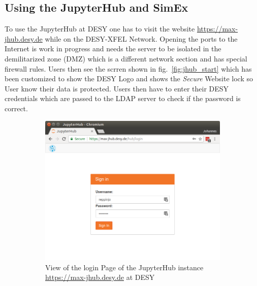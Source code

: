 \documentclass[10pt]{scrartcl}
\begin{document}
\subsection{Using the JupyterHub and SimEx}
To use the JupyterHub at DESY one has to visit the website \url{https://max-jhub.desy.de} while on the DESY-XFEL Network.
Opening the ports to the Internet is work in progress and needs the server to be isolated in the demilitarized zone (DMZ) which is a different network section and has special firewall rules.
Users then see the scrren shown in fig.~\ref{fig:jhub_start} which has been customized to show the DESY Logo and shows the \textit{Secure} Website lock so User know their data is protected.
Users then have to enter their DESY credentials which are passed to the LDAP server to check if the password is correct.
%
\begin{figure}
  \centering
  \begin{subfigure}{0.45\textwidth} %
	  \includegraphics[width=\textwidth]{figures/jhub001.png}
	  \caption{View of the login Page of the JupyterHub instance \url{https://max-jhub.desy.de} at DESY} %
  \end{subfigure}
  \vspace{1em} %
  \begin{subfigure}{0.45\textwidth} %

\end{subfigure}
\end{figure}
\end{document}
